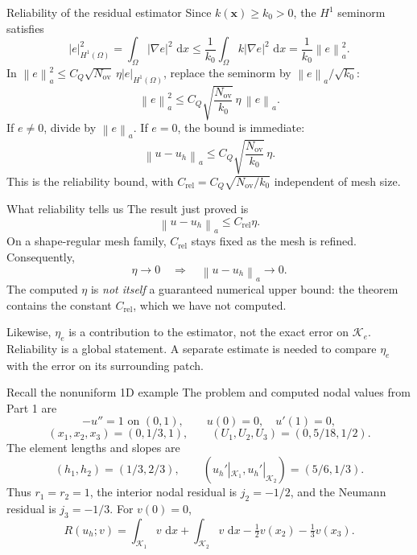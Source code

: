 \documentclass[11pt,aspectratio=169]{beamer}
\newcommand{\dd}{\,\mathrm{d}}
\newcommand{\Om}{\Omega}
\newcommand{\norm}[2][]{\left\lVert#2\right\rVert_{#1}}
\newcommand{\seminorm}[2][]{\left\lvert#2\right\rvert_{#1}}
\newcommand{\grad}{\nabla}
\newcommand{\bx}{\bm x}
\begin{document}
\begin{frame}{Reliability of the residual estimator}
Since $k(\bx)\geq k_0>0$, the $H^1$ seminorm satisfies
\[
 \seminorm[H^1(\Om)]{e}^2
 =\int_\Om|\grad e|^2\,\dd x
 \leq\frac1{k_0}\int_\Om k|\grad e|^2\,\dd x
 =\frac1{k_0}\norm[a]{e}^2.
\]
In $\norm[a]{e}^2\leq C_Q\sqrt{N_{\mathrm{ov}}}\,\eta
\seminorm[H^1(\Om)]{e}$, replace the seminorm by
$\norm[a]{e}/\sqrt{k_0}$:
\[
 \norm[a]{e}^2\leq
 C_Q\sqrt{\frac{N_{\mathrm{ov}}}{k_0}}\,\eta\,\norm[a]{e}.
\]
If $e\neq0$, divide by $\norm[a]{e}$. If $e=0$, the bound is immediate:
\[
  \boxed{\norm[a]{u-u_h}\leq
  C_Q\sqrt{\frac{N_{\mathrm{ov}}}{k_0}}\,\eta.}
\]
This is the reliability bound, with
$C_{\mathrm{rel}}=C_Q\sqrt{N_{\mathrm{ov}}/k_0}$ independent of mesh size.
\end{frame}

\begin{frame}{What reliability tells us}
The result just proved is
\[
 \norm[a]{u-u_h}\leq C_{\mathrm{rel}}\eta.
\]
On a shape-regular mesh family, $C_{\mathrm{rel}}$ stays fixed as the mesh
is refined. Consequently,
\[
 \eta\longrightarrow0\quad\Longrightarrow\quad
 \norm[a]{u-u_h}\longrightarrow0.
\]
The computed $\eta$ is \emph{not itself} a guaranteed numerical upper bound:
the theorem contains the constant $C_{\mathrm{rel}}$, which we have not
computed.

Likewise, $\eta_e$ is a contribution to the estimator, not the exact error
on $\mathcal K_e$. Reliability is a global statement. A separate estimate is
needed to compare $\eta_e$ with the error on its surrounding patch.
\end{frame}

\begin{frame}{Recall the nonuniform 1D example}
The problem and computed nodal values from Part 1 are
\[
 -u''=1\text{ on }(0,1),\qquad u(0)=0,\quad u'(1)=0,
\]
\[
 (x_1,x_2,x_3)=(0,1/3,1),\qquad
 (U_1,U_2,U_3)=(0,5/18,1/2).
\]
The element lengths and slopes are
\[
 (h_1,h_2)=(1/3,2/3),\qquad
 (u_h'|_{\mathcal K_1},u_h'|_{\mathcal K_2})=(5/6,1/3).
\]
Thus $r_1=r_2=1$, the interior nodal residual is $j_2=-1/2$, and the
Neumann residual is $j_3=-1/3$. For $v(0)=0$,
\[
 R(u_h;v)=\int_{\mathcal K_1}v\,\dd x+
 \int_{\mathcal K_2}v\,\dd x-\tfrac12v(x_2)-\tfrac13v(x_3).
\]
\end{frame}
\end{document}

